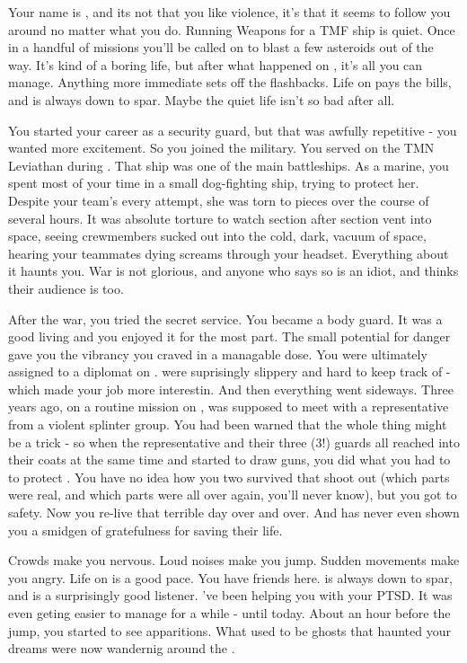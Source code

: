 \documentclass[char]{TMFHope}
\begin{document}
\name{\cWeap{}}

Your name is \cWeap{}, and its not that you like violence, it's that it seems to follow you around no matter what you do. Running Weapons for a TMF ship is quiet. Once in a handful of missions you'll be called on to blast a few asteroids out of the way. It's kind of a boring life, but after what happened on \pHome{}, it's all you can manage. Anything more immediate sets off the flashbacks. Life on \pNew{} pays the bills, and \cSci{} is always down to spar. Maybe the quiet life isn't so bad after all.

You started your career as a security guard, but that was awfully repetitive - you wanted more excitement. So you joined the military. You served on the TMN Leviathan during \pBattle{}. That ship was one of the \pPlan{} main battleships. As a marine, you spent most of your time in a small dog-fighting ship, trying to protect her. Despite your team's every attempt, she was torn to pieces over the course of several hours. It was absolute torture to watch section after section vent into space, seeing crewmembers sucked out into the cold, dark, vacuum of space, hearing your teammates dying screams through your headset. Everything about it haunts you. War is not glorious, and anyone who says so is an idiot, and thinks their audience is too.

After the war, you tried the \pPlan{} secret service. You became a body guard. It was a good living and you enjoyed it for the most part. The small potential for danger gave you the vibrancy you craved in a managable dose. You were ultimately assigned to a diplomat on \pHome{}. \cDip{\They} were suprisingly slippery and hard to keep track of - which made your job more interestin. And then everything went sideways. Three years ago, on a routine mission on \pHome{}, \cDip{} was supposed to meet with a representative from a violent splinter group. You had been warned that the whole thing might be a trick - so when the representative and their three (3!) guards all reached into their coats at the same time and started to draw guns, you did what you had to to protect \cDip{}. You have no idea how you two survived that shoot out (which parts were real, and which parts were \pBattle{} all over again, you'll never know), but you got \cDip{\them} to safety. Now you re-live that terrible day over and over. And \cDip{} has never even shown you a smidgen of gratefulness for saving their life.

Crowds make you nervous. Loud noises make you jump. Sudden movements make you angry. Life on \pNew{} is a good pace. You have friends here. \cSci{} is always down to spar, and \cNav{} is a surprisingly good listener. \cNav{\They}'ve been helping you with your PTSD. It was even geting easier to manage for a while - until today. About an hour before the jump, you started to see apparitions. What used to be ghosts that haunted your dreams were now wandernig around the \pNew{}.
\end{document}
